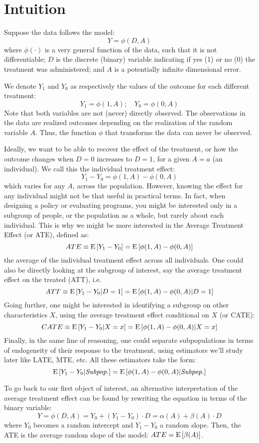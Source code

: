 \section{Intuition}

Suppose the data follows the model: $$ Y = \phi(D, A) $$ where $\phi(\cdot)$ is a very general function of the data, such that it is not differentiable; $D$ is the discrete (binary) variable indicating if yes (1) or no (0) the treatment was administered; and $A$ is a potentially infinite dimensional error.

We denote $Y_1$ and $Y_0$ as respectively the values of the outcome for each different treatment: $$Y_1 = \phi(1, A) ; \quad Y_0 = \phi(0, A) $$ Note that both variables are not (never) directly observed. The observations in the data are realized outcomes depending on the realization of the random variable $A$. Thus, the function $\phi$ that transforms the data can never be observed.

Ideally, we want to be able to recover the effect of the treatment, or how the outcome changes when $D=0$ increases to $D=1$, for a given $A = a$ (an individual). We call this the individual treatment effect: $$Y_1 - Y_0 = \phi(1, A) - \phi(0, A) $$ which varies for any $A$, across the population. However, knowing the effect for any individual might not be that useful in practical terms. In fact, when designing a policy or evaluating programs, you might be interested only in a subgroup of people, or the population as a whole, but rarely about each individual. This is why we might be more interested in the Average Treatment Effect (or ATE), defined as: $$ATE \equiv \operatorname{E}\left[Y_1 - Y_0\right] = \operatorname{E}\left[\phi(1, A) - \phi(0, A)\right] $$ the average of the individual treatment effect across all individuals. One could also be directly looking at the subgroup of interest, say the average treatment effect on the treated (ATT), i.e. $$ ATT \equiv \operatorname{E}\left[Y_1 - Y_0\vert D = 1\right] = \operatorname{E}\left[\phi(1, A) - \phi(0, A)\vert D=1\right] $$ Going further, one might be interested in identifying a subgroup on other characteristics $X$, using the average treatment effect conditional on $X$ (or CATE): $$CATE \equiv \operatorname{E}\left[Y_1 - Y_0\vert X = x\right] = \operatorname{E}\left[\phi(1, A) - \phi(0, A)\vert X=x\right] $$ Finally, in the same line of reasoning, one could separate subpopulations in terms of endogeneity of their response to the treatment, using estimators we'll study later like LATE, MTE, etc. All these estimators take the form: $$ \operatorname{E}\left[Y_1 - Y_0\vert \textit{Subpop.}\right] = \operatorname{E}\left[\phi(1, A) - \phi(0, A)\vert \textit{Subpop.}\right] $$

To go back to our first object of interest, an alternative interpretation of the average treatment effect can be found by rewriting the equation in terms of the binary variable: $$Y = \phi(D, A) = Y_0 + (Y_1 - Y_0)\cdot D = \alpha(A) + \beta(A)\cdot D $$ where $Y_0$ becomes a random intercept and $Y_1 - Y_0$ a random slope. Then, the ATE is the average random slope of the model: $ATE = \operatorname{E}\left[\beta(A)\right]$.

